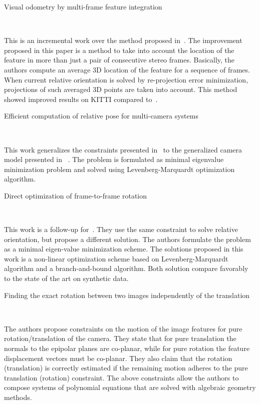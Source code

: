 \documentclass[10pt]{article}         %
\begin{document}
\begin{enumerate}
  {\Large \item Visual odometry by multi-frame feature
    integration}~\cite{badino2013visual}

  This is an incremental work over the method proposed
  in~\cite{geiger2011stereoscan}.  The improvement proposed in this
  paper is a method to take into account the location of the feature
  in more than just a pair of consecutive stereo frames.  Basically,
  the authors compute an average 3D location of the feature for a
  sequence of frames.  When current relative orientation is solved by
  re-projection error minimization, projections of such averaged 3D
  points are taken into account.  This method showed improved results
  on KITTI compared to~\cite{geiger2011stereoscan}.

  {\Large \item Efficient computation of relative pose for multi-camera systems}~\cite{kneip2014efficient}

  This work generalizes the constraints presented
  in~\cite{kneip2012finding} to the generalized camera model presented
  in ~\cite{pless2003using}.  The problem is formulated as minimal
  eigenvalue minimization problem and solved using Levenberg-Marquardt
  optimization algorithm.


  {\Large \item Direct optimization of frame-to-frame
    rotation}~\cite{kneip2013direct}

  This work is a follow-up for~\cite{kneip2012finding}.  They use the
  same constraint to solve relative orientation, but propose a
  different solution. The authors formulate the problem as a minimal
  eigen-value minimization scheme. The solutions proposed in this work
  is a non-linear optimization scheme based on Levenberg-Marquardt
  algorithm and a branch-and-bound algorithm.  Both solution compare
  favorably to the state of the art on synthetic data.

  {\Large \item Finding the exact rotation between two images
    independently of the translation}~\cite{kneip2012finding}
  
  The authors propose constraints on the motion of the image features
  for pure rotation/translation of the camera.  They state that for
  pure translation the normals to the epipolar planes are co-planar,
  while for pure rotation the feature displacement vectors must be
  co-planar.  They also claim that the rotation (translation) is
  correctly estimated if the remaining motion adheres to the pure
  translation (rotation) constraint.  The above constraints allow the
  authors to compose systems of polynomial equations that are solved
  with algebraic geometry methods.
  

\end{enumerate}
\end{document}
